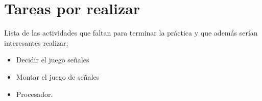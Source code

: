 \documentclass[%
	final,
	notitlepage,
	narroweqnarray,
	inline,
	twoside,
	]{ieee}
\begin{document}


\section{Tareas por realizar}
Lista de las actividades que faltan para terminar la práctica y
que además serían interesantes realizar:
\begin{itemize}
\item Decidir el juego señales
\item Montar el juego de señales
\item Procesador.
\end{itemize}





\end{document}
